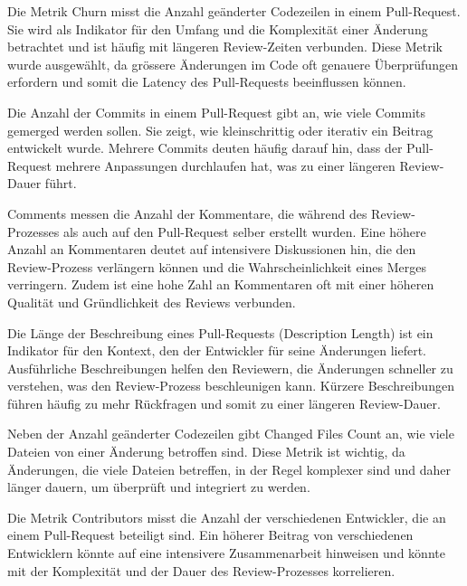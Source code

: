 Die Metrik Churn misst die Anzahl geänderter Codezeilen in einem Pull-Request. Sie wird als Indikator für den Umfang und die Komplexität einer Änderung betrachtet und ist häufig mit längeren Review-Zeiten verbunden. Diese Metrik wurde ausgewählt, da grössere Änderungen im Code oft genauere Überprüfungen erfordern und somit die Latency des Pull-Requests beeinflussen können. \parencite{gousios_exploratory_2014}

Die Anzahl der Commits in einem Pull-Request gibt an, wie viele Commits gemerged werden sollen. Sie zeigt, wie kleinschrittig oder iterativ ein Beitrag entwickelt wurde. Mehrere Commits deuten häufig darauf hin, dass der Pull-Request mehrere Anpassungen durchlaufen hat, was zu einer längeren Review-Dauer führt. \parencite{zhang_pull_2022}

Comments messen die Anzahl der Kommentare, die während des Review-Prozesses als auch auf den Pull-Request selber erstellt wurden. Eine höhere Anzahl an Kommentaren deutet auf intensivere Diskussionen hin, die den Review-Prozess verlängern können und die Wahrscheinlichkeit eines Merges verringern. Zudem ist eine hohe Zahl an Kommentaren oft mit einer höheren Qualität und Gründlichkeit des Reviews verbunden. \parencite{tsay_influence_2014}

Die Länge der Beschreibung eines Pull-Requests (Description Length) ist ein Indikator für den Kontext, den der Entwickler für seine Änderungen liefert. Ausführliche Beschreibungen helfen den Reviewern, die Änderungen schneller zu verstehen, was den Review-Prozess beschleunigen kann. Kürzere Beschreibungen führen häufig zu mehr Rückfragen und somit zu einer längeren Review-Dauer. \parencite{zhang_pull_2022}

Neben der Anzahl geänderter Codezeilen gibt Changed Files Count an, wie viele Dateien von einer Änderung betroffen sind. Diese Metrik ist wichtig, da Änderungen, die viele Dateien betreffen, in der Regel komplexer sind und daher länger dauern, um überprüft und integriert zu werden. \parencite{tsay_influence_2014}

Die Metrik Contributors misst die Anzahl der verschiedenen Entwickler, die an einem Pull-Request beteiligt sind. Ein höherer Beitrag von verschiedenen Entwicklern könnte auf eine intensivere Zusammenarbeit hinweisen und könnte mit der Komplexität und der Dauer des Review-Prozesses korrelieren. \parencite{tsay_influence_2014}

